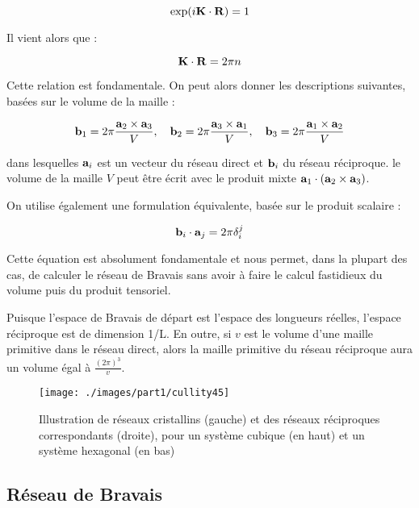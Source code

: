 \begin{equation}
\exp(i \mathbf{K}\cdot \mathbf{R}) = 1
\label{eq:defresreciproque}
\end{equation}

Il vient alors que :

\begin{equation}
    \mathbf{K} \cdot \mathbf{R} = 2 \pi n
    \label{eq:fondreseaurec}
\end{equation}

Cette relation est fondamentale. On peut alors donner les descriptions suivantes, basées sur le volume de la
maille :

\begin{equation}
\mathbf{b}_1 = 2\pi \frac{\mathbf{a}_2 \times \mathbf{a}_3}{V},\quad
\mathbf{b}_2 = 2\pi \frac{\mathbf{a}_3 \times \mathbf{a}_1}{V},\quad
\mathbf{b}_3 = 2\pi \frac{\mathbf{a}_1 \times \mathbf{a}_2}{V}
\end{equation}

dans lesquelles $\mathbf{a}_i$ est un vecteur du réseau direct et $\mathbf{b}_i$ du réseau réciproque. le volume de la maille $V$ peut être écrit avec le produit mixte $\mathbf{a}_1 \cdot (\mathbf{a}_2 \times \mathbf{a}_3)$.

On utilise également une formulation équivalente, basée sur le produit scalaire :

\begin{equation}
\mathbf{b}_i \cdot \mathbf{a}_j = 2\pi \delta_i^j
\label{eq:reseaureciproque}
\end{equation}

Cette équation est absolument fondamentale et nous permet, dans la plupart des cas, de calculer le réseau de Bravais sans avoir à faire le calcul fastidieux du volume puis du produit tensoriel.

Puisque l'espace de Bravais de départ est l'espace des longueurs réelles, l'espace réciproque est de dimension 1/L. En outre, si $v$ est le volume d'une maille primitive dans le réseau direct, alors la maille primitive du réseau réciproque aura un volume égal à $\frac{(2\pi)^3}{v}$.

\begin{figure}
    \texttt{[image: ./images/part1/cullity45]}
    \caption{Illustration de réseaux cristallins (gauche) et des réseaux
        réciproques correspondants (droite), pour un système cubique (en haut) et
    un système hexagonal (en bas)}
    \label{fig:reciprocal}
\end{figure}

\subsection{Réseau de Bravais}

